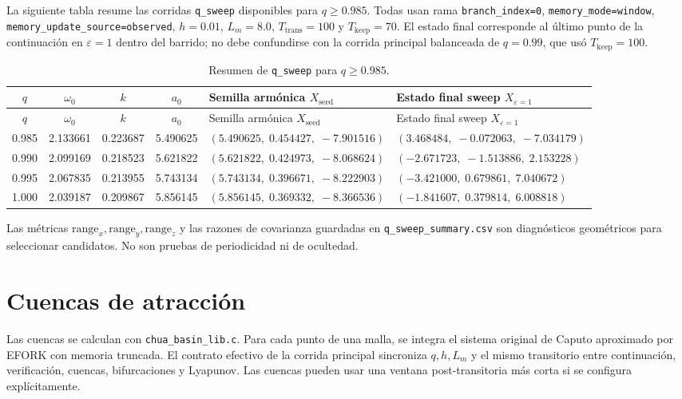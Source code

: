 \documentclass[11pt]{article}
\begin{document}
La siguiente tabla resume las corridas \texttt{q\_sweep} disponibles para
\(q\geq0.985\). Todas usan rama \texttt{branch\_index=0},
\texttt{memory\_mode=window}, \texttt{memory\_update\_source=observed},
\(h=0.01\), \(L_m=8.0\), \(T_{\mathrm{trans}}=100\) y
\(T_{\mathrm{keep}}=70\). El estado final corresponde al último punto de la
continuación en \(\varepsilon=1\) dentro del barrido; no debe confundirse con
la corrida principal balanceada de \(q=0.99\), que usó \(T_{\mathrm{keep}}=100\).

\begin{longtable}{@{}c c c c p{3.8cm} p{3.8cm}@{}}
\caption{Resumen de \texttt{q\_sweep} para \(q\geq0.985\).}\\
\toprule
\(q\) & \(\omega_0\) & \(k\) & \(a_0\) & Semilla armónica \(X_{\mathrm{seed}}\) & Estado final sweep \(X_{\varepsilon=1}\) \\
\midrule
\endfirsthead
\toprule
\(q\) & \(\omega_0\) & \(k\) & \(a_0\) & Semilla armónica \(X_{\mathrm{seed}}\) & Estado final sweep \(X_{\varepsilon=1}\) \\
\midrule
\endhead
0.985 & 2.133661 & 0.223687 & 5.490625 &
\((5.490625,\;0.454427,\;-7.901516)\) &
\((3.468484,\;-0.072063,\;-7.034179)\) \\
0.990 & 2.099169 & 0.218523 & 5.621822 &
\((5.621822,\;0.424973,\;-8.068624)\) &
\((-2.671723,\;-1.513886,\;2.153228)\) \\
0.995 & 2.067835 & 0.213955 & 5.743134 &
\((5.743134,\;0.396671,\;-8.222903)\) &
\((-3.421000,\;0.679861,\;7.040672)\) \\
1.000 & 2.039187 & 0.209867 & 5.856145 &
\((5.856145,\;0.369332,\;-8.366536)\) &
\((-1.841607,\;0.379814,\;6.008818)\) \\
\bottomrule
\end{longtable}

Las métricas \(\mathrm{range}_x,\mathrm{range}_y,\mathrm{range}_z\) y las
razones de covarianza guardadas en \texttt{q\_sweep\_summary.csv} son
diagnósticos geométricos para seleccionar candidatos. No son pruebas de
periodicidad ni de ocultedad.

\section{Cuencas de atracción}

Las cuencas se calculan con \texttt{chua\_basin\_lib.c}. Para cada punto de
una malla, se integra el sistema original de Caputo aproximado por EFORK con
memoria truncada. El contrato efectivo de la corrida principal sincroniza
\(q,h,L_m\) y el mismo transitorio entre continuación, verificación,
cuencas, bifurcaciones y Lyapunov. Las cuencas pueden usar una ventana
post-transitoria más corta si se configura explícitamente.
\end{document}
